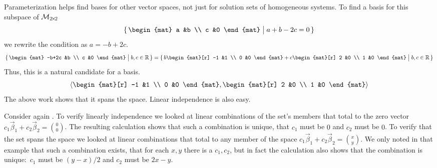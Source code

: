 \begin{example}
Parameterization helps find bases for other vector spaces, not just
for solution sets of homogeneous systems.
To find a basis for this subspace of $\mathcal{M}_{2 \! \times \! 2}$
\begin{equation*}
  \set{\begin{mat}
         a  &b  \\
         c  &0
       \end{mat} \suchthat a+b-2c=0}
\end{equation*}
we rewrite the condition as $a=-b+2c$.
\begin{equation*}
  \set{\begin{mat}
         -b+2c  &b  \\
          c     &0
       \end{mat} \suchthat b,c \in \Re}
  =\set{b\begin{mat}[r]
         -1  &1  \\
          0  &0
       \end{mat}+
       c\begin{mat}[r]
          2  &0  \\
          1  &0
       \end{mat} \suchthat b,c \in \Re}
\end{equation*}
Thus, this is a natural candidate for a basis.
\begin{equation*}
  \sequence{\begin{mat}[r]
         -1  &1  \\
          0  &0
       \end{mat},
       \begin{mat}[r]
          2  &0  \\
          1  &0
       \end{mat} }
\end{equation*}
The above work shows that it spans the space.
Linear independence is also easy.
\end{example}

Consider again .
To verify linearly independence we looked at 
linear combinations of the set's members that total to
the zero vector 
$c_1\vec{\beta}_1+c_2\vec{\beta}_2=\binom{0}{0}$.
The resulting 
calculation shows that such a combination is unique,
that $c_1$ must be $0$ and $c_2$ must be $0$.
To verify that the set spans the space we
looked at linear combinations that total to any
member of the space
$c_1\vec{\beta}_1+c_2\vec{\beta}_2=\binom{x}{y}$.
We only noted in that example that such a combination 
exists, that for each $x,y$ there is a $c_1,c_2$, but
in fact the calculation also shows that the combination is 
unique:~$c_1$ must be $(y-x)/2$ and $c_2$ must be $2x-y$.
 
